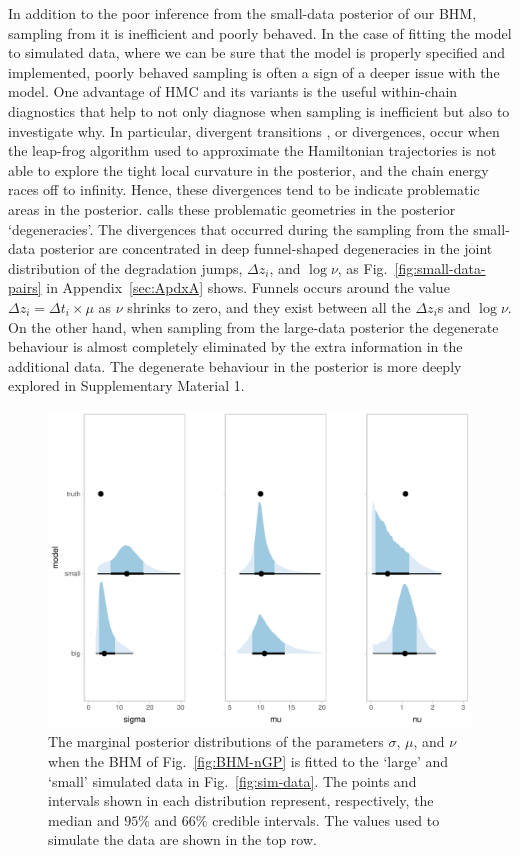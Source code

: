 \documentclass{article}
\begin{document}
In addition to the poor inference from the small-data posterior of our BHM, sampling from it is inefficient and poorly behaved. In the case of fitting the model to simulated data, where we can be sure that the model is properly specified and implemented, poorly behaved sampling is often a sign of a deeper issue with the model. One advantage of HMC and its variants is the useful within-chain diagnostics that help to not only diagnose when sampling is inefficient but also to investigate why. In particular, divergent transitions \citep{betancourt_conceptual_2017}, or divergences, occur when the leap-frog algorithm used to approximate the Hamiltonian trajectories is not able to explore the tight local curvature in the posterior, and the chain energy races off to infinity. Hence, these divergences tend to be indicate problematic areas in the posterior. \citet{betancourt_conceptual_2017} calls these problematic geometries in the posterior `degeneracies'. The divergences that occurred during the sampling from the small-data posterior are concentrated in deep funnel-shaped degeneracies in the joint distribution of the degradation jumps, $\Delta z_i$, and $\log\nu$, as Fig.~\ref{fig:small-data-pairs} in Appendix~\ref{sec:ApdxA} shows. Funnels occurs around the value $\Delta z_i = \Delta t_i \times \mu$ as $\nu$ shrinks to zero, and they exist between all the $\Delta z_i$s and $\log\nu$. On the other hand, when sampling from the large-data posterior the degenerate behaviour is almost completely eliminated by the extra information in the additional data. The degenerate behaviour in the posterior is more deeply explored in Supplementary Material 1.

\begin{figure}
    \centering
    \includegraphics[width=0.8\columnwidth]{../figures/marginal-posterior_a.pdf}
    \caption{The marginal posterior distributions of the parameters $\sigma$, $\mu$, and $\nu$ when the BHM of Fig.~\ref{fig:BHM-nGP} is fitted to the `large' and `small' simulated data in Fig.~\ref{fig:sim-data}. The points and intervals shown in each distribution represent, respectively, the median and $95\%$ and $66\%$ credible intervals. The values used to simulate the data are shown in the top row.}
    \label{fig:marginal-post}
\end{figure}
\end{document}
